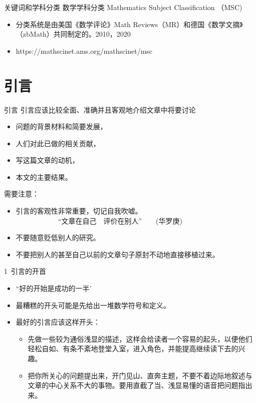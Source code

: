 \documentclass[13pt]{ctexbeamer}
\begin{document}
\begin{frame}{关键词和学科分类}
	数学学科分类 Mathematics Subject Classification  （MSC)
	\begin{itemize}

		\item 分类系统是由美国《数学评论》Math Reviews（MR）和德国《数学文摘》（zbMath）共同制定的。2010，2020

		\item https://mathscinet.ams.org/mathscinet/msc
	\end{itemize}
\end{frame}


\section{引言}
\begin{frame}{引言}
	引言应该比较全面、准确并且客观地介绍文章中将要讨论
	\begin{itemize}
		\item 问题的背景材料和简要发展，
		\item 人们对此已做的相关贡献，
		\item 写这篇文章的动机，
		\item 本文的主要结果。
	\end{itemize}
需要注意：
	\begin{itemize}
	\item 引言的客观性非常重要，切记自我吹嘘。\\
	~~~~~~~~~~~~``文章在自己~~评价在别人''~~~~(华罗庚)
	\item 不要随意贬低别人的研究。
	\item 不要把别人的甚至自己以前的文章句子原封不动地直接移植过来。
\end{itemize}
\end{frame}

\begin{frame}{1~引言的开首}
		\begin{itemize}
		\item ``好的开始是成功的一半'

		\item 最糟糕的开头可能是先给出一堆数学符号和定义。

		\item  最好的引言应该这样开头：
	\begin{itemize}
		\item 先做一些较为通俗浅显的描述，这样会给读者一个容易的起头，以便他们轻松自如、有条不紊地登堂入室，进入角色，并能提高继续读下去的兴趣。
		\item  把你所关心的问题提出来，开门见山、直奔主题，不要不着边际地叙述与文章的中心关系不大的事物。要用直截了当、浅显易懂的语音把问题指出来。
	\end{itemize}
	\end{itemize}
\end{frame}
\end{document}
